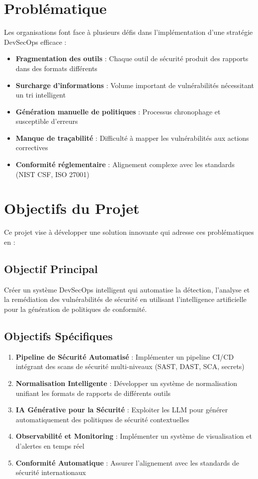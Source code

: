 \documentclass[12pt,a4paper]{report}
\begin{document}
\section{Problématique}

Les organisations font face à plusieurs défis dans l'implémentation d'une stratégie DevSecOps efficace :

\begin{itemize}
    \item \textbf{Fragmentation des outils} : Chaque outil de sécurité produit des rapports dans des formats différents
    \item \textbf{Surcharge d'informations} : Volume important de vulnérabilités nécessitant un tri intelligent
    \item \textbf{Génération manuelle de politiques} : Processus chronophage et susceptible d'erreurs
    \item \textbf{Manque de traçabilité} : Difficulté à mapper les vulnérabilités aux actions correctives
    \item \textbf{Conformité réglementaire} : Alignement complexe avec les standards (NIST CSF, ISO 27001)
\end{itemize}

\section{Objectifs du Projet}

Ce projet vise à développer une solution innovante qui adresse ces problématiques en :

\subsection{Objectif Principal}
Créer un système DevSecOps intelligent qui automatise la détection, l'analyse et la remédiation des vulnérabilités de sécurité en utilisant l'intelligence artificielle pour la génération de politiques de conformité.

\subsection{Objectifs Spécifiques}
\begin{enumerate}
    \item \textbf{Pipeline de Sécurité Automatisé} : Implémenter un pipeline CI/CD intégrant des scans de sécurité multi-niveaux (SAST, DAST, SCA, secrets)
    \item \textbf{Normalisation Intelligente} : Développer un système de normalisation unifiant les formats de rapports de différents outils
    \item \textbf{IA Générative pour la Sécurité} : Exploiter les LLM pour générer automatiquement des politiques de sécurité contextuelles
    \item \textbf{Observabilité et Monitoring} : Implémenter un système de visualisation et d'alertes en temps réel
    \item \textbf{Conformité Automatique} : Assurer l'alignement avec les standards de sécurité internationaux
\end{enumerate}
\end{document}
